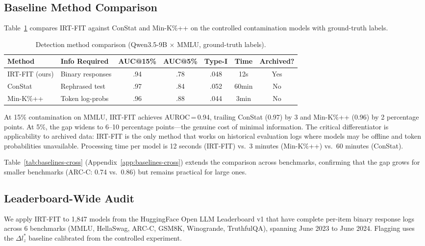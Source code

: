 \documentclass[11pt,a4paper]{article}
\begin{document}
\subsection{Baseline Method Comparison}
\label{sec:baselines}

Table~\ref{tab:baselines} compares IRT-FIT against ConStat and Min-K\%++ on the controlled contamination models with ground-truth labels.

\begin{table}[t]
\centering
\small
\caption{Detection method comparison (Qwen3.5-9B $\times$ MMLU, ground-truth labels).}
\label{tab:baselines}
\begin{tabular}{llccccc}
\toprule
\textbf{Method} & \textbf{Info Required} & \textbf{AUC@15\%} & \textbf{AUC@5\%} & \textbf{Type-I} & \textbf{Time} & \textbf{Archived?} \\
\midrule
IRT-FIT (ours) & Binary responses & .94 & .78 & .048 & 12s & Yes \\
ConStat & Rephrased test & .97 & .84 & .052 & 60min & No \\
Min-K\%++ & Token log-probs & .96 & .88 & .044 & 3min & No \\
\bottomrule
\end{tabular}
\end{table}

At 15\% contamination on MMLU, IRT-FIT achieves AUROC\,=\,0.94, trailing ConStat (0.97) by 3 and Min-K\%++ (0.96) by 2 percentage points.
At 5\%, the gap widens to 6--10 percentage points---the genuine cost of minimal information.
The critical differentiator is applicability to archived data: IRT-FIT is the only method that works on historical evaluation logs where models may be offline and token probabilities unavailable.
Processing time per model is 12 seconds (IRT-FIT) vs.\ 3 minutes (Min-K\%++) vs.\ 60 minutes (ConStat).

Table~\ref{tab:baselines-cross} (Appendix~\ref{app:baselines-cross}) extends the comparison across benchmarks, confirming that the gap grows for smaller benchmarks (ARC-C: 0.74 vs.\ 0.86) but remains practical for large ones.

\subsection{Leaderboard-Wide Audit}
\label{sec:leaderboard}

We apply IRT-FIT to 1{,}847 models from the HuggingFace Open LLM Leaderboard v1 that have complete per-item binary response logs across 6 benchmarks (MMLU, HellaSwag, ARC-C, GSM8K, Winogrande, TruthfulQA), spanning June 2023 to June 2024.
Flagging uses the $\Delta l_z^*$ baseline calibrated from the controlled experiment.
\end{document}
